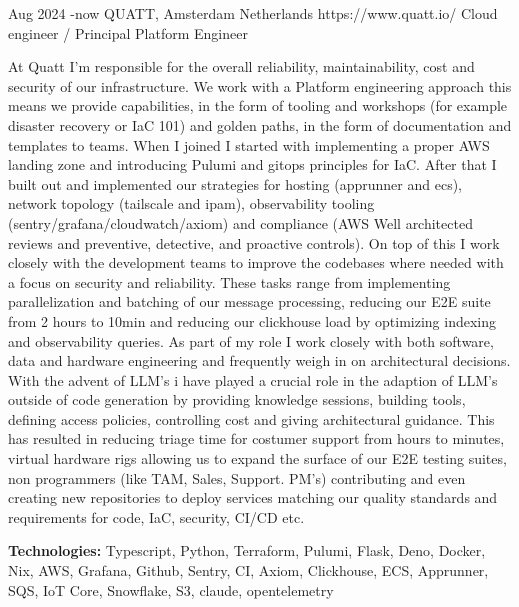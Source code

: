 \documentclass[10pt]{article} %
\begin{document}
\job
{Aug 2024 -}{now}
{QUATT, Amsterdam Netherlands}
{https://www.quatt.io/}
{Cloud engineer / Principal Platform Engineer}
{At Quatt I'm responsible for the overall reliability, maintainability, cost and security of our infrastructure. We work with a Platform engineering approach this means we provide capabilities, in the form of tooling and workshops (for example disaster recovery or IaC 101) and golden paths, in the form of documentation and templates to teams. When I joined I started with implementing a proper AWS landing zone and introducing Pulumi and gitops principles for IaC. After that I built out and implemented our strategies for hosting (apprunner and ecs), network topology (tailscale and ipam), observability tooling (sentry/grafana/cloudwatch/axiom) and compliance (AWS Well architected reviews and preventive, detective, and proactive controls). On top of this I work closely with the development teams to improve the codebases where needed with a focus on security and reliability. These tasks range from implementing parallelization and batching of our message processing, reducing our E2E suite from 2 hours to 10min and reducing our clickhouse load by optimizing indexing and observability queries. As part of my role I work closely with both software, data and hardware engineering and frequently weigh in on architectural decisions. With the advent of LLM's i have played a crucial role in the adaption of LLM's outside of code generation by providing knowledge sessions, building tools, defining access policies, controlling cost and giving architectural guidance. This has resulted in reducing triage time for costumer support from hours to minutes, virtual hardware rigs allowing us to expand the surface of our E2E testing suites, non programmers (like TAM, Sales, Support. PM's) contributing and even creating new repositories to deploy services matching our quality standards and requirements for code, IaC, security, CI/CD etc.

\rule{0mm}{5mm}\textbf{Technologies:} Typescript, Python, Terraform, Pulumi, Flask, Deno, Docker, Nix, AWS, Grafana, Github, Sentry, CI, Axiom, Clickhouse, ECS, Apprunner, SQS, IoT Core, Snowflake, S3, claude, opentelemetry}
\end{document}
